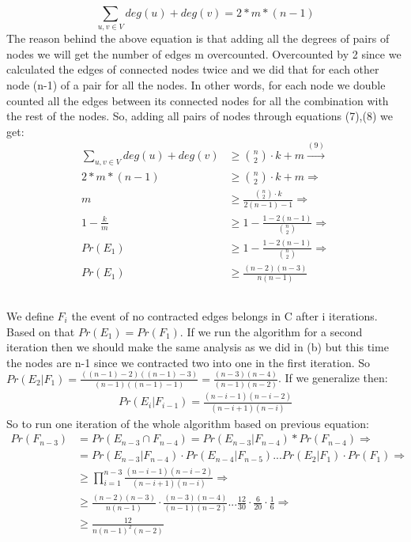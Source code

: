 \documentclass[11pt]{537homework}
\begin{document}
\begin{equation}
 \sum_{u,v \in V}^{} deg(u)+deg(v) = 2*m*(n-1)
\end{equation}
The reason behind the above equation is that adding all the degrees of pairs of nodes we will get the number of edges m overcounted. Overcounted by 2 since we calculated the edges of connected nodes twice and we did that for each other node (n-1) of a pair for all the nodes. In other words, for each node we double counted all the edges between its connected nodes for all the combination with the rest of the nodes. So, adding all pairs of nodes through equations (7),(8) we get:    
\begingroup
\allowdisplaybreaks
\begin{align*}
 \sum_{u,v \in V}^{} deg(u)+deg(v) &\geq {{n}\choose{2}} \cdot k + m \xrightarrow{(9)}\\
 2*m*(n-1) &\geq {{n}\choose{2}} \cdot k + m \Longrightarrow \\
  m &\geq \frac{{{n}\choose{2}} \cdot k}{2(n-1)-1} \Longrightarrow \\
     1 - \frac{k}{m} &\geq 1 - \frac{1-2(n-1)}{{{n}\choose{2}} } \Longrightarrow \\
     Pr(E_1)  &\geq 1 - \frac{1-2(n-1)}{{{n}\choose{2}}} \Longrightarrow \\
            Pr(E_1)  &\geq \frac{(n-2)(n-3)}{n(n-1)} 
\end{align*}
\endgroup
\subsection{}
We define $F_i$ the event of no contracted edges belongs in C after i iterations. Based on that $Pr(E_1) = Pr(F_1)$.
If we run the algorithm for a second iteration then we should make the same analysis as we did in (b) but this time the nodes are n-1 since we contracted two into one in the first iteration. So $Pr(E_2|F_1) = \frac{((n-1)-2)((n-1)-3)}{(n-1)((n-1)-1)}=\frac{(n-3)(n-4)}{(n-1)(n-2)}$. If we generalize then:
\begin{align*}
    Pr(E_{i}|F_{i-1}) =\frac{(n-i-1)(n-i-2)}{(n-i+1)(n-i)}
\end{align*}
So to run one iteration of the whole algorithm based on previous equation:
\begingroup
\allowdisplaybreaks
\begin{align*}
 Pr(F_{n-3}) &=Pr(E_{n-3} \cap F_{n-4}) = Pr(E_{n-3} | F_{n-4})*Pr(F_{n-4}) \Longrightarrow \\
             &=Pr(E_{n-3} | F_{n-4}) \cdot Pr(E_{n-4} | F_{n-5})...Pr(E_2|F_1) \cdot Pr(F_{1}) \Longrightarrow \\
             & \geq \prod_{i=1}^{n-3} \frac{(n-i-1)(n-i-2)}{(n-i+1)(n-i)} \Longrightarrow \\
             & \geq \frac{(n-2)(n-3)}{n(n-1)} \cdot \frac{(n-3)(n-4)}{(n-1)(n-2)} ... \frac{12}{30}\cdot\frac{6}{20} \cdot \frac{1}{6} \Longrightarrow \\
             & \geq \frac{12}{n(n-1)^{2}(n-2)}
\end{align*}
\endgroup
\end{document}
